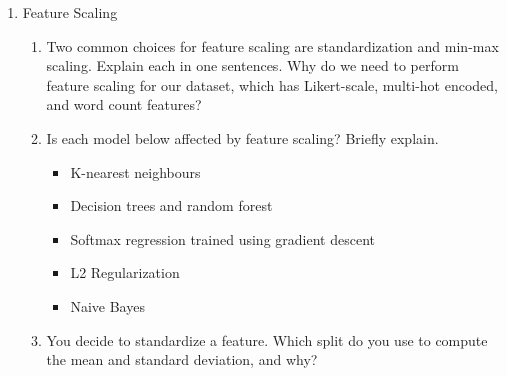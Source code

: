 \documentclass[12pt]{article}
\begin{document}
\begin{enumerate}
\begin{enumerate}
\item At least one free-text question asks for a number. How would you turn such a text
  response into a number, and when would you declare a response unparseable?

\item What are some strategies to convert the free-text responses to numeric features?

\item One common technique for processing the free-text responses is TF-IDF
  vectorization. Explain this technique in detail. Why is this technique suitable for
  processing the free-text data?

\item How should we handle a word that appears at prediction time but never in the
  training split?

\item After encoding all the features, you recorded that there are 1100 features and 300
  examples. How would the ratio between these two inform your model choices? Why would
  you choose a simpler model with strong regularization over a larger model?

\end{enumerate}

\item Feature Scaling

\begin{enumerate}

\item Two common choices for feature scaling are standardization and min-max scaling.
  Explain each in one sentences. Why do we need to perform feature scaling for our
  dataset, which has Likert-scale, multi-hot encoded, and word count features?

\item Is each model below affected by feature scaling? Briefly explain.
\begin{itemize}
\item K-nearest neighbours
\item Decision trees and random forest
\item Softmax regression trained using gradient descent
\item L2 Regularization
\item Naive Bayes
\end{itemize}

\item You decide to standardize a feature. Which split do you use to compute the mean
  and standard deviation, and why?


\end{enumerate}
\end{enumerate}
\end{document}
